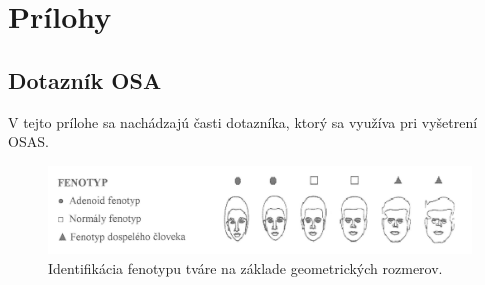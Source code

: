 \hidefromtoc

\renewcommand \thechapter{\roman{chapter}}
\renewcommand \thesection{\roman{chapter}.\roman{section}}
\renewcommand \thesubsection{\roman{chapter}.\roman{section}.\roman{subsection}}

\renewcommand{\thefigure}{\roman{chapter}.\roman{figure}}
\renewcommand{\thetable}{\roman{chapter}.\roman{table}}


\chapter{Prílohy}

\section{Dotazník OSA} \label{sec:Priloha:Dot}
V tejto prílohe sa nachádzajú časti dotazníka, ktorý sa využíva pri vyšetrení OSAS.

\begin{figure}[H]
	\centering
	\includegraphics[width=\textwidth]{figures/dotaznik_1.png}
	\caption{Identifikácia fenotypu tváre na základe geometrických rozmerov.}
	\label{fig:dotaznik:a}
\end{figure}

